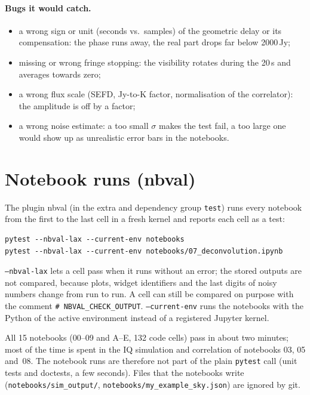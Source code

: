 \paragraph*{Bugs it would catch.}
\begin{itemize}
  \item a wrong sign or unit (seconds vs.\ samples) of the geometric
        delay or its compensation: the phase runs away, the real part
        drops far below 2000\,Jy;
  \item missing or wrong fringe stopping: the visibility rotates during
        the 20\,s and averages towards zero;
  \item a wrong flux scale (SEFD, Jy-to-K factor, normalisation of the
        correlator): the amplitude is off by a factor;
  \item a wrong noise estimate: a too small $\sigma$ makes the test
        fail, a too large one would show up as unrealistic error bars in
        the notebooks.
\end{itemize}

\section{Notebook runs (nbval)}\label{sec:nbval}

The plugin nbval (in the extra and dependency group \texttt{test}) runs
every notebook from the first to the last cell in a fresh kernel and
reports each cell as a test:
\begin{lstlisting}[basicstyle=\ttfamily\footnotesize, frame=single]
pytest --nbval-lax --current-env notebooks
pytest --nbval-lax --current-env notebooks/07_deconvolution.ipynb
\end{lstlisting}
\texttt{--nbval-lax} lets a cell pass when it runs without an error; the
stored outputs are not compared, because plots, widget identifiers and
the last digits of noisy numbers change from run to run. A cell can still
be compared on purpose with the comment \texttt{\# NBVAL\_CHECK\_OUTPUT}.
\texttt{--current-env} runs the notebooks with the Python of the active
environment instead of a registered Jupyter kernel.

All 15 notebooks (00--09 and A--E, 132 code cells) pass in about two
minutes; most of the time is spent in the IQ simulation and correlation
of notebooks 03, 05 and~08. The notebook runs are therefore not part of
the plain \texttt{pytest} call (unit tests and doctests, a few seconds).
Files that the notebooks write (\texttt{notebooks/sim\_output/},
\texttt{notebooks/my\_example\_sky.json}) are ignored by git.

